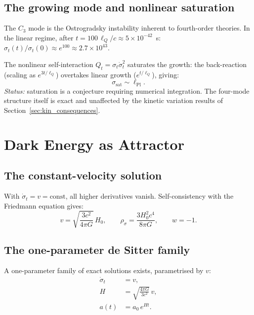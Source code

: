 \documentclass[11pt,a4paper]{article}
\theoremstyle{plain}
\theoremstyle{definition}
\theoremstyle{remark}
\newcommand{\lQ}{\ell_Q}
\newcommand{\dotv}{\dot\sigma_t}
\begin{document}
\subsection{The growing mode and nonlinear saturation}

The $C_3$ mode is the Ostrogradsky instability inherent to fourth-order
theories.  In the linear regime, after $t = 100\,\lQ/c \approx
5\times10^{-42}$~s:
$\sigma_t(t)/\sigma_t(0) \approx e^{100} \approx 2.7\times10^{43}$.

The nonlinear self-interaction $Q_t = \sigma_t\dotv^2$ saturates the
growth: the back-reaction (scaling as $e^{3t/\lQ}$) overtakes linear
growth ($e^{t/\lQ}$), giving:
\begin{equation}
  \sigma_{\mathrm{sat}} \sim \ell_{\mathrm{Pl}}.
\end{equation}
\emph{Status:} saturation is a conjecture requiring numerical integration.
The four-mode structure itself is exact and unaffected by the kinetic
variation results of Section~\ref{sec:kin_consequences}.

\section{Dark Energy as Attractor}
\label{sec:dark_energy}

\subsection{The constant-velocity solution}

With $\dotv = v = \mathrm{const}$, all higher derivatives vanish.
Self-consistency with the Friedmann equation gives:
\begin{equation}
  \boxed{v = \sqrt{\frac{3c^2}{4\pi G}}\,H_0, \qquad
         \rho_\sigma = \frac{3H_0^2 c^4}{8\pi G}, \qquad w = -1.}
  \label{eq:attractor}
\end{equation}

\subsection{The one-parameter de Sitter family}

A one-parameter family of exact solutions exists, parametrised by $v$:
\begin{align}
  \dotv &= v, \\
  H &= \sqrt{\frac{4\pi G}{3c^2}}\,v, \\
  a(t) &= a_0\,e^{Ht}.
\end{align}
\end{document}
